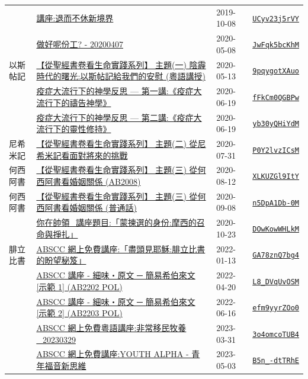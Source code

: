 \documentclass{book}
\begin{document}
{ \scriptsize


\begin{xltabular}{\textwidth}{|p{0.15\textwidth} p{0.6\textwidth}|p{0.07\textwidth} p{0.1\textwidth}|}
\hline
    & \hyperref[sec:UCyv23j5rVY]{講座:退而不休新境界} & 2019-10-08 & \href{https://youtube.com/watch?v=UCyv23j5rVY}{\texttt{UCyv23j5rVY}} \\
    & \hyperref[sec:JwFqk5bcKhM]{做好呢份工? - 20200407} & 2020-05-08 & \href{https://youtube.com/watch?v=JwFqk5bcKhM}{\texttt{JwFqk5bcKhM}} \\
以斯帖記   & \hyperref[sec:9pqygotXAuo]{【從聖經書卷看生命實踐系列】 主題(一) 陰霾時代的曙光:以斯帖記給我們的安慰 (粵語講授)} & 2020-05-13 & \href{https://youtube.com/watch?v=9pqygotXAuo}{\texttt{9pqygotXAuo}} \\
    & \hyperref[sec:fFkCm0QGBPw]{疫症大流行下的神學反思 --- 第一講:《疫症大流行下的禱告神學》} & 2020-06-19 & \href{https://youtube.com/watch?v=fFkCm0QGBPw}{\texttt{fFkCm0QGBPw}} \\
    & \hyperref[sec:yb30yQHiYdM]{疫症大流行下的神學反思 --- 第二講:《疫症大流行下的靈性修持》} & 2020-06-19 & \href{https://youtube.com/watch?v=yb30yQHiYdM}{\texttt{yb30yQHiYdM}} \\
尼希米記   & \hyperref[sec:P0Y2lvzICsM]{【從聖經書卷看生命實踐系列】 主題(二) 從尼希米記看面對將來的挑戰} & 2020-07-31 & \href{https://youtube.com/watch?v=P0Y2lvzICsM}{\texttt{P0Y2lvzICsM}} \\
何西阿書   & \hyperref[sec:XLKUZGl9ItY]{【從聖經書卷看生命實踐系列】 主題(三) 從何西阿書看婚姻關係 (AB2008)} & 2020-08-12 & \href{https://youtube.com/watch?v=XLKUZGl9ItY}{\texttt{XLKUZGl9ItY}} \\
何西阿書   & \hyperref[sec:n5DpA1Db_0M]{【從聖經書卷看生命實踐系列】 主題(三) 從何西阿書看婚姻關係 (普通話)} & 2020-09-08 & \href{https://youtube.com/watch?v=n5DpA1Db-0M}{\texttt{n5DpA1Db-0M}} \\
    & \hyperref[sec:DOwKowWHLkM]{你在帥領\_講座題目:「蒙揀選的身份:摩西的召命與掙扎」} & 2020-10-23 & \href{https://youtube.com/watch?v=DOwKowWHLkM}{\texttt{DOwKowWHLkM}} \\
腓立比書   & \hyperref[sec:GA78znQ7bg4]{ABSCC 網上免費講座:「盡頭見耶穌:腓立比書的盼望秘笈」} & 2022-01-13 & \href{https://youtube.com/watch?v=GA78znQ7bg4}{\texttt{GA78znQ7bg4}} \\
    & \hyperref[sec:L8_DVqUvOSM]{ABSCC 講座 - 細味‧原文 ─ 簡易希伯來文 [示範 1] (AB2202 POL)} & 2022-04-20 & \href{https://youtube.com/watch?v=L8_DVqUvOSM}{\texttt{L8\_DVqUvOSM}} \\
    & \hyperref[sec:efm9yyrZOo0]{ABSCC 講座 - 細味‧原文 ─ 簡易希伯來文 [示範 2] (AB2203 POL)} & 2022-06-16 & \href{https://youtube.com/watch?v=efm9yyrZOo0}{\texttt{efm9yyrZOo0}} \\
    & \hyperref[sec:3o4omcoTUB4]{ABSCC 網上免費粵語講座:非常移民牧養\_20230329} & 2023-03-31 & \href{https://youtube.com/watch?v=3o4omcoTUB4}{\texttt{3o4omcoTUB4}} \\
    & \hyperref[sec:B5n__dtTRhE]{ABSCC 網上免費講座:YOUTH ALPHA - 青年福音新思維} & 2023-05-03 & \href{https://youtube.com/watch?v=B5n_-dtTRhE}{\texttt{B5n\_-dtTRhE}} \\
\end{xltabular}
}
\end{document}
